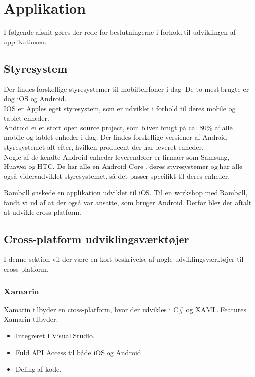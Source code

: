 \section{Applikation}                                   
I følgende afsnit gøres der rede for beslutningerne i forhold til udviklingen af applikationen.

\subsection{Styresystem}
Der findes forskellige styresystemer til mobiltelefoner i dag. De to mest brugte\cite{OS} er dog iOS \cite{iOS} og Android. \cite{Android} \\
IOS er Apples eget styresystem, som er udviklet i forhold til deres mobile og tablet enheder. \\
Android er et stort open source project, som bliver brugt på ca. 80\% af alle mobile og tablet enheder i dag. Der findes forskellige versioner af Android styresystemet alt efter, hvilken producent der har leveret enheder\cite{OS}. \\
Nogle af de kendte Android enheder leverendører er firmaer som Samsung, Huawei og HTC. De har alle en Android Core i deres styresystemer og har alle også videreudviklet styresystemet, så det passer specifikt til deres enheder.

Rambøll ønskede en applikation udviklet til iOS. Til en workshop med Rambøll, fandt vi ud af at der også var ansatte, som bruger Android. Derfor blev der aftalt at udvikle cross-platform.

\subsection{Cross-platform udviklingsværktøjer}
I denne sektion vil der være en kort beskrivelse af nogle udviklingsværktøjer til cross-platform.

\subsubsection{Xamarin}
Xamarin\cite{Xarmain} tilbyder en cross-platform, hvor der udvikles i C\#\cite{CSharp} og XAML\cite{XAML}.
Features Xamarin tilbyder:
\begin{itemize}[-]
	\item Integreret i Visual Studio.
	\item Fuld API Access til både iOS og Android.
	\item Deling af kode.
\end{itemize}

